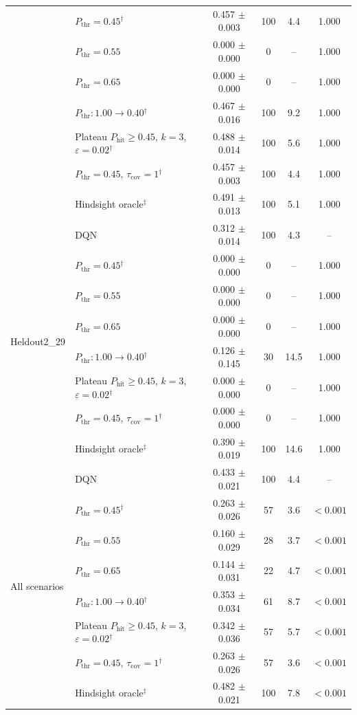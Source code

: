 \begin{table}[htbp]
\begin{tabular}{llcccc}
 & $P_{\mathrm{thr}}=0.45$$^{\dagger}$ & 0.457 $\pm$ 0.003 & 100 & 4.4 & 1.000 \\
 & $P_{\mathrm{thr}}=0.55$ & 0.000 $\pm$ 0.000 & 0 & -- & 1.000 \\
 & $P_{\mathrm{thr}}=0.65$ & 0.000 $\pm$ 0.000 & 0 & -- & 1.000 \\
 & $P_{\mathrm{thr}}: 1.00 \to 0.40$$^{\dagger}$ & 0.467 $\pm$ 0.016 & 100 & 9.2 & 1.000 \\
 & Plateau $P_{\mathrm{hit}}\geq0.45$, $k=3$, $\varepsilon=0.02$$^{\dagger}$ & 0.488 $\pm$ 0.014 & 100 & 5.6 & 1.000 \\
 & $P_{\mathrm{thr}}=0.45$, $\tau_{\mathrm{cov}}=1$$^{\dagger}$ & 0.457 $\pm$ 0.003 & 100 & 4.4 & 1.000 \\
 & Hindsight oracle$^{\ddagger}$ & 0.491 $\pm$ 0.013 & 100 & 5.1 & 1.000 \\
\midrule
\multirow{8}{*}{Heldout2\_29} & DQN & 0.312 $\pm$ 0.014 & 100 & 4.3 & -- \\
 & $P_{\mathrm{thr}}=0.45$$^{\dagger}$ & 0.000 $\pm$ 0.000 & 0 & -- & 1.000 \\
 & $P_{\mathrm{thr}}=0.55$ & 0.000 $\pm$ 0.000 & 0 & -- & 1.000 \\
 & $P_{\mathrm{thr}}=0.65$ & 0.000 $\pm$ 0.000 & 0 & -- & 1.000 \\
 & $P_{\mathrm{thr}}: 1.00 \to 0.40$$^{\dagger}$ & 0.126 $\pm$ 0.145 & 30 & 14.5 & 1.000 \\
 & Plateau $P_{\mathrm{hit}}\geq0.45$, $k=3$, $\varepsilon=0.02$$^{\dagger}$ & 0.000 $\pm$ 0.000 & 0 & -- & 1.000 \\
 & $P_{\mathrm{thr}}=0.45$, $\tau_{\mathrm{cov}}=1$$^{\dagger}$ & 0.000 $\pm$ 0.000 & 0 & -- & 1.000 \\
 & Hindsight oracle$^{\ddagger}$ & 0.390 $\pm$ 0.019 & 100 & 14.6 & 1.000 \\
\midrule
\multirow{8}{*}{All scenarios} & DQN & 0.433 $\pm$ 0.021 & 100 & 4.4 & -- \\
 & $P_{\mathrm{thr}}=0.45$$^{\dagger}$ & 0.263 $\pm$ 0.026 & 57 & 3.6 & $<0.001$ \\
 & $P_{\mathrm{thr}}=0.55$ & 0.160 $\pm$ 0.029 & 28 & 3.7 & $<0.001$ \\
 & $P_{\mathrm{thr}}=0.65$ & 0.144 $\pm$ 0.031 & 22 & 4.7 & $<0.001$ \\
 & $P_{\mathrm{thr}}: 1.00 \to 0.40$$^{\dagger}$ & 0.353 $\pm$ 0.034 & 61 & 8.7 & $<0.001$ \\
 & Plateau $P_{\mathrm{hit}}\geq0.45$, $k=3$, $\varepsilon=0.02$$^{\dagger}$ & 0.342 $\pm$ 0.036 & 57 & 5.7 & $<0.001$ \\
 & $P_{\mathrm{thr}}=0.45$, $\tau_{\mathrm{cov}}=1$$^{\dagger}$ & 0.263 $\pm$ 0.026 & 57 & 3.6 & $<0.001$ \\
 & Hindsight oracle$^{\ddagger}$ & 0.482 $\pm$ 0.021 & 100 & 7.8 & $<0.001$ \\
\bottomrule
\end{tabular}
\end{table}
